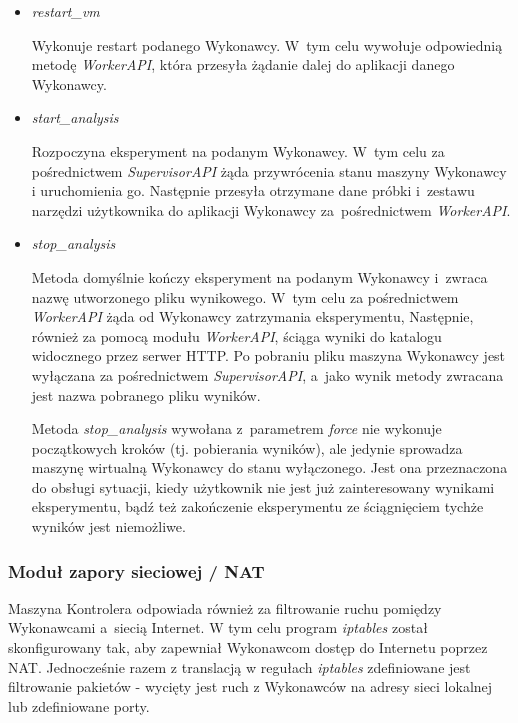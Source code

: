 \documentclass[a4paper,12pt,oneside]{article}
\begin{document}
\begin{itemize}
\begin{itemize}
			\item \textit{restart\_vm}
			
			Wykonuje restart podanego Wykonawcy. W~tym celu wywołuje odpowiednią metodę \textit{WorkerAPI}, która przesyła żądanie dalej do aplikacji danego Wykonawcy.
			
			\item \textit{start\_analysis}
			
			Rozpoczyna eksperyment na podanym Wykonawcy. W~tym celu za pośrednictwem \textit{SupervisorAPI} żąda przywrócenia stanu maszyny Wykonawcy i uruchomienia go. Następnie przesyła otrzymane dane próbki i~zestawu narzędzi użytkownika do aplikacji Wykonawcy za~pośrednictwem \textit{WorkerAPI}.
			
			\item \textit{stop\_analysis}
			
			Metoda domyślnie kończy eksperyment na podanym Wykonawcy i~zwraca nazwę utworzonego pliku wynikowego. W~tym celu za pośrednictwem \textit{WorkerAPI} żąda od Wykonawcy zatrzymania eksperymentu, Następnie, również za pomocą modułu \textit{WorkerAPI}, ściąga wyniki do katalogu widocznego przez serwer HTTP. Po pobraniu pliku maszyna Wykonawcy jest wyłączana za pośrednictwem \textit{SupervisorAPI}, a~jako wynik metody zwracana jest nazwa pobranego pliku wyników.
			
			Metoda \textit{stop\_analysis} wywołana z~parametrem \textit{force} nie wykonuje początkowych kroków (tj. pobierania wyników), ale jedynie sprowadza maszynę wirtualną Wykonawcy do stanu wyłączonego. Jest ona przeznaczona do obsługi sytuacji, kiedy użytkownik nie jest już zainteresowany wynikami eksperymentu, bądź też zakończenie eksperymentu ze ściągnięciem tychże wyników jest niemożliwe.
						
		\end{itemize}
	\end{itemize}
	
	\subsubsection{Moduł zapory sieciowej / NAT}
	
	Maszyna Kontrolera odpowiada również za filtrowanie ruchu pomiędzy Wykonawcami a~siecią Internet. W tym celu program \textit{iptables} został skonfigurowany tak, aby zapewniał Wykonawcom dostęp do Internetu poprzez NAT. Jednocześnie razem z translacją w regułach \textit{iptables} zdefiniowane jest filtrowanie pakietów - wycięty jest ruch z Wykonawców na adresy sieci lokalnej lub zdefiniowane porty.
	
\end{document}
